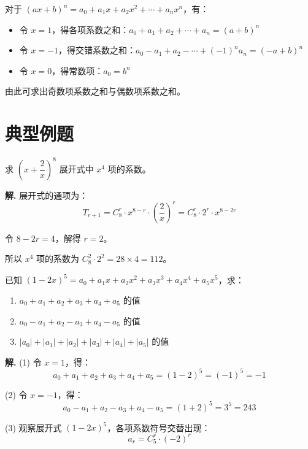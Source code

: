 \documentclass[11pt]{ctexrep}
\begin{document}
\begin{property}[赋值法求系数和]
    对于 $(ax + b)^n = a_0 + a_1x + a_2x^2 + \cdots + a_nx^n$，有：
    \begin{itemize}
        \item 令 $x = 1$，得各项系数之和：$a_0 + a_1 + a_2 + \cdots + a_n = (a + b)^n$
        \item 令 $x = -1$，得交错系数之和：$a_0 - a_1 + a_2 - \cdots + (-1)^n a_n = (-a + b)^n$
        \item 令 $x = 0$，得常数项：$a_0 = b^n$
    \end{itemize}
    由此可求出奇数项系数之和与偶数项系数之和。
\end{property}

\section*{典型例题}

\begin{example}[通项公式的应用]
    求 $\left( x + \dfrac{2}{x} \right)^8$ 展开式中 $x^4$ 项的系数。
\end{example}

\textbf{解.} 展开式的通项为：
\[
    T_{r+1} = C_8^r \cdot x^{8-r} \cdot \left( \frac{2}{x} \right)^r = C_8^r \cdot 2^r \cdot x^{8-2r}
\]

令 $8 - 2r = 4$，解得 $r = 2$。

所以 $x^4$ 项的系数为 $C_8^2 \cdot 2^2 = 28 \times 4 = 112$。

\begin{example}[二项式系数与项的系数的区别]
    已知 $(1 - 2x)^5 = a_0 + a_1x + a_2x^2 + a_3x^3 + a_4x^4 + a_5x^5$，求：
    \begin{enumerate}
        \item $a_0 + a_1 + a_2 + a_3 + a_4 + a_5$ 的值
        \item $a_0 - a_1 + a_2 - a_3 + a_4 - a_5$ 的值
        \item $|a_0| + |a_1| + |a_2| + |a_3| + |a_4| + |a_5|$ 的值
    \end{enumerate}
\end{example}

\textbf{解.} (1) 令 $x = 1$，得：
\[
    a_0 + a_1 + a_2 + a_3 + a_4 + a_5 = (1 - 2)^5 = (-1)^5 = -1
\]

(2) 令 $x = -1$，得：
\[
    a_0 - a_1 + a_2 - a_3 + a_4 - a_5 = (1 + 2)^5 = 3^5 = 243
\]

(3) 观察展开式 $(1 - 2x)^5$，各项系数符号交替出现：
\[
    a_r = C_5^r \cdot (-2)^r
\]
\end{document}
